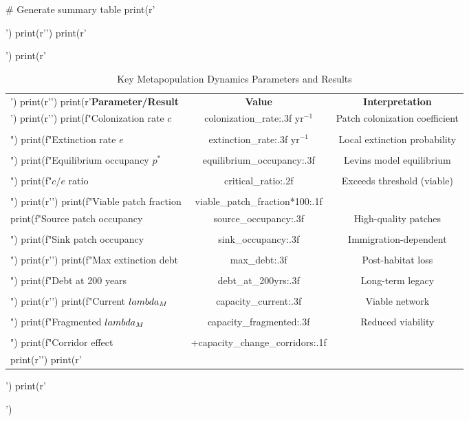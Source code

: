 \documentclass[11pt,a4paper]{article}
\begin{document}
\begin{pycode}
# Generate summary table
print(r'\begin{table}[H]')
print(r'\centering')
print(r'\caption{Key Metapopulation Dynamics Parameters and Results}')
print(r'\begin{tabular}{@{}lcc@{}}')
print(r'\toprule')
print(r'\textbf{Parameter/Result} & \textbf{Value} & \textbf{Interpretation} \\')
print(r'\midrule')
print(f"Colonization rate $c$ & {colonization_rate:.3f} yr$^{{-1}}$ & Patch colonization coefficient \\\\")
print(f"Extinction rate $e$ & {extinction_rate:.3f} yr$^{{-1}}$ & Local extinction probability \\\\")
print(f"Equilibrium occupancy $p^*$ & {equilibrium_occupancy:.3f} & Levins model equilibrium \\\\")
print(f"$c/e$ ratio & {critical_ratio:.2f} & Exceeds threshold (viable) \\\\")
print(r'\midrule')
print(f"Viable patch fraction & {viable_patch_fraction*100:.1f}\\%
print(f"Source patch occupancy & {source_occupancy:.3f} & High-quality patches \\\\")
print(f"Sink patch occupancy & {sink_occupancy:.3f} & Immigration-dependent \\\\")
print(r'\midrule')
print(f"Max extinction debt & {max_debt:.3f} & Post-habitat loss \\\\")
print(f"Debt at 200 years & {debt_at_200yrs:.3f} & Long-term legacy \\\\")
print(r'\midrule')
print(f"Current $\\lambda_M$ & {capacity_current:.3f} & Viable network \\\\")
print(f"Fragmented $\\lambda_M$ & {capacity_fragmented:.3f} & Reduced viability \\\\")
print(f"Corridor effect & +{capacity_change_corridors:.1f}\\%
print(r'\bottomrule')
print(r'\end{tabular}')
print(r'\end{table}')
\end{pycode}
\end{document}
